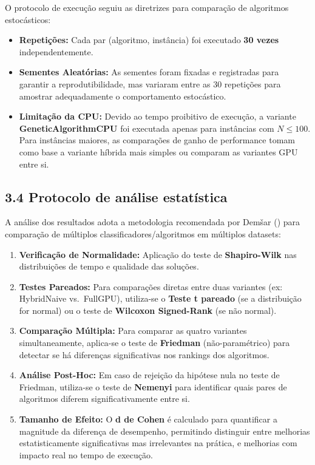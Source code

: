 O protocolo de execução seguiu as diretrizes para comparação de
algoritmos estocásticos:

\begin{itemize}
\tightlist
\item
  \textbf{Repetições:} Cada par (algoritmo, instância) foi executado
  \textbf{30 vezes} independentemente.
\item
  \textbf{Sementes Aleatórias:} As sementes foram fixadas e registradas
  para garantir a reprodutibilidade, mas variaram entre as 30 repetições
  para amostrar adequadamente o comportamento estocástico.
\item
  \textbf{Limitação da CPU:} Devido ao tempo proibitivo de execução, a
  variante \textbf{GeneticAlgorithmCPU} foi executada apenas para
  instâncias com \(N \le 100\). Para instâncias maiores, as comparações
  de ganho de performance tomam como base a variante híbrida mais
  simples ou comparam as variantes GPU entre si.
\end{itemize}

\subsection{3.4 Protocolo de análise
estatística}\label{sec-34-protocolo-estatistico}

A análise dos resultados adota a metodologia recomendada por Demšar
() para comparação de múltiplos
classificadores/algoritmos em múltiplos datasets:

\begin{enumerate}
\def\labelenumi{\arabic{enumi}.}
\tightlist
\item
  \textbf{Verificação de Normalidade:} Aplicação do teste de
  \textbf{Shapiro-Wilk} nas distribuições de tempo e qualidade das
  soluções.
\item
  \textbf{Testes Pareados:} Para comparações diretas entre duas
  variantes (ex: HybridNaive vs.~FullGPU), utiliza-se o \textbf{Teste t
  pareado} (se a distribuição for normal) ou o teste de \textbf{Wilcoxon
  Signed-Rank} (se não normal).
\item
  \textbf{Comparação Múltipla:} Para comparar as quatro variantes
  simultaneamente, aplica-se o teste de \textbf{Friedman}
  (não-paramétrico) para detectar se há diferenças significativas nos
  rankings dos algoritmos.
\item
  \textbf{Análise Post-Hoc:} Em caso de rejeição da hipótese nula no
  teste de Friedman, utiliza-se o teste de \textbf{Nemenyi} para
  identificar quais pares de algoritmos diferem significativamente entre
  si.
\item
  \textbf{Tamanho de Efeito:} O \textbf{d de Cohen} é calculado para
  quantificar a magnitude da diferença de desempenho, permitindo
  distinguir entre melhorias estatisticamente significativas mas
  irrelevantes na prática, e melhorias com impacto real no tempo de
  execução.
\end{enumerate}

